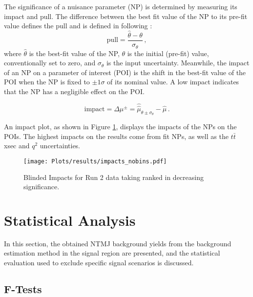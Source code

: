 The significance of a nuisance parameter (NP) is determined by measuring its impact and pull.   The difference between the best fit value of the NP to its pre-fit value defines the pull and is defined in following : 
\begin{equation}
	\mathrm{pull} = \frac{\hat{\theta}-\theta}{\sigma_\theta}\,,
\end{equation}
where \(\hat{\theta}\) is the best-fit value of the NP, \(\theta\) is the initial (pre-fit) value, conventionally set to zero, and \(\sigma_\theta\) is the input uncertainty. Meanwhile, the impact of an NP on a parameter of interest (POI) is the shift in the best-fit value of the POI when the NP is fixed to $\pm 1 \sigma$ of its nominal value. A low impact indicates that the NP has a negligible effect on the POI. 

\begin{equation}
	\mathrm{impact} = \Delta \mu^{\pm}=\hat{\hat{\mu}}_{\theta \pm \sigma_{\theta}}-\hat{\mu}\,.
\end{equation}

An impact plot, as shown in Figure \ref{fig:impacts}, displays the impacts of the NPs on the POIs. The highest impacts on the results come from fit NPs, as well as the $t\bar{t}$ xsec and $q^{2}$ uncertainties.

\begin{figure}[!htbp]
	\begin{center}
		\texttt{[image: Plots/results/impacts\_nobins.pdf]} 
		\caption{Blinded Impacts for Run 2 data taking ranked in decreasing significance.}
		\label{fig:impacts}
	\end{center}
\end{figure}

\clearpage


\clearpage


\section{Statistical Analysis}
\label{sec:stats}

In this section, the obtained NTMJ background yields from the background estimation method in the signal region are presented, and the statistical evaluation used to exclude specific signal scenarios is discussed.


\subsection{F-Tests}
\label{sec:ftests}

